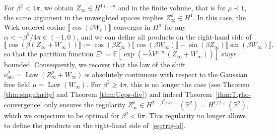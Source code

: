 \documentclass[11pt, a4paper]{scrartcl}
\numberwithin{equation}{section}
\theoremstyle{plain}
\theoremstyle{remark}
\newcommand{\assign}{:=}
\newcommand{\tmop}[1]{\ensuremath{\operatorname{#1}}}
\begin{document}
For $\beta^2 < 4 \pi$, we obtain $Z_{\infty} \in H^{1 +, - n}$ and in the
finite volume, that is for $\rho \prec 1$, the same argument in the unweighted
spaces implies $Z^{\rho}_{\infty} \in H^1$. In this case, the Wick ordered cosine $\llbracket \cos (\beta W_t) \rrbracket$
converges in $H^{\alpha}$ for any $\alpha < - \beta^2 / 4 \pi\in (-1,0)$, and we can define
all products on the right-hand side of
\begin{equation}
  \llbracket \cos (\beta (Z_{\infty} + W_{\infty})) \rrbracket \assign \cos
  (\beta Z_{\infty}) \llbracket \cos (\beta W_{\infty}) \rrbracket - \sin
  (\beta Z_{\infty}) \llbracket \sin (\beta W_{\infty}) \rrbracket,
  \label{eq:trig-id}
\end{equation}
so that the partition function $\Xi^{\rho} =\mathbb{E} [\exp (- \bar{\lambda}
V^{\rho, \infty} (Z_{\infty} + W_{\infty}))]$ stays bounded. Consequently, we
recover that the law of the shift $\nu_{\tmop{SG}}^{\rho} = \tmop{Law}
(Z_{\infty}^{\rho} + W_{\infty})$ is absolutely continuous with respect to the
Gaussian free field $\mu = \tmop{Law} (W_{\infty})$. For $\beta^2 \geqslant 4
\pi$, this is no longer the case (see Theorem \ref{thm:singularity} and
Theorem \ref{thm:Ueps-div}) and indeed Theorem~\ref{thm:T,rho-convergence}
only ensures the regularity $Z^{\rho}_{\infty} \in H^{2 - \beta^2 / 4 \pi -}
(\mathbb{R}^2) = H^{1 / 2 +} (\mathbb{R}^2)$, which we conjecture to be
optimal for $\beta^2<6\pi$. This regularity no longer allows to define the products on the right-hand side of~\eqref{eq:trig-id}.
\end{document}
